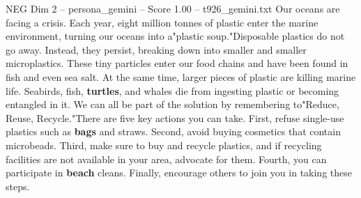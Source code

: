 \begin{textsample}{NEG Dim 2 – persona\_gemini – Score 1.00 – t926\_gemini.txt}  \label{ex:f2_neg_005}
Our oceans are facing a crisis.
Each year, eight million tonnes of plastic enter the marine environment, turning our oceans into a"plastic soup."Disposable plastics do not go away.
Instead, they persist, breaking down into smaller and smaller microplastics.
These tiny particles enter our food chains and have been found in fish and even sea salt.
At the same time, larger pieces of plastic are killing marine life.
Seabirds, fish, \textbf{turtles}, and whales die from ingesting plastic or becoming entangled in it.
We can all be part of the solution by remembering to"Reduce, Reuse, Recycle."There are five key actions you can take.
First, refuse single-use plastics such as \textbf{bags} and straws.
Second, avoid buying cosmetics that contain microbeads.
Third, make sure to buy and recycle plastics, and if recycling facilities are not available in your area, advocate for them.
Fourth, you can participate in \textbf{beach} cleans.
Finally, encourage others to join you in taking these steps.

\end{textsample}
